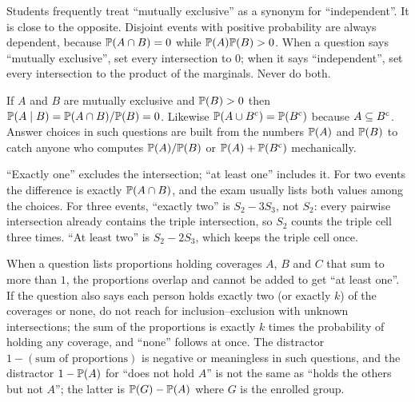 \begin{trap}
Students frequently treat ``mutually exclusive'' as a synonym for ``independent''. It is
close to the opposite. Disjoint events with positive probability are always dependent,
because $\mathbb{P}(A \cap B) = 0$ while $\mathbb{P}(A)\mathbb{P}(B) > 0$. When a question says ``mutually
exclusive'', set every intersection to $0$; when it says ``independent'', set every
intersection to the product of the marginals. Never do both.
\end{trap}

\begin{trap}
If $A$ and $B$ are mutually exclusive and $\mathbb{P}(B) > 0$ then
$\mathbb{P}(A \mid B) = \mathbb{P}(A \cap B)/\mathbb{P}(B) = 0$. Likewise
$\mathbb{P}(A \cup B^{\mathrm{c}}) = \mathbb{P}(B^{\mathrm{c}})$ because $A \subseteq B^{\mathrm{c}}$. Answer choices in such
questions are built from the numbers $\mathbb{P}(A)$ and $\mathbb{P}(B)$ to catch anyone who computes
$\mathbb{P}(A)/\mathbb{P}(B)$ or $\mathbb{P}(A) + \mathbb{P}(B^{\mathrm{c}})$ mechanically.
\end{trap}

\begin{trap}
``Exactly one'' excludes the intersection; ``at least one'' includes it. For two events the
difference is exactly $\mathbb{P}(A \cap B)$, and the exam usually lists both values among the
choices. For three events, ``exactly two'' is $S_2 - 3S_3$, not $S_2$: every pairwise
intersection already contains the triple intersection, so $S_2$ counts the triple cell three
times. ``At least two'' is $S_2 - 2S_3$, which keeps the triple cell once.
\end{trap}

\begin{trap}
When a question lists proportions holding coverages $A$, $B$ and $C$ that sum to more than
$1$, the proportions overlap and cannot be added to get ``at least one''. If the question
also says each person holds exactly two (or exactly $k$) of the coverages or none, do not
reach for inclusion--exclusion with unknown intersections; the sum of the proportions is
exactly $k$ times the probability of holding any coverage, and ``none'' follows at once.
The distractor $1 - (\text{sum of proportions})$ is negative or meaningless in such
questions, and the distractor $1 - \mathbb{P}(A)$ for ``does not hold $A$'' is not the same as
``holds the others but not $A$''; the latter is $\mathbb{P}(G) - \mathbb{P}(A)$ where $G$ is the
enrolled group.
\end{trap}

